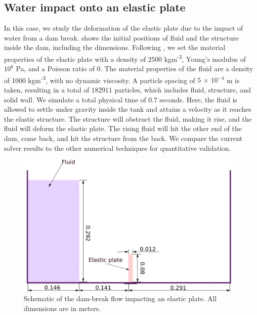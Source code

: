 \subsection{Water impact onto an elastic plate}
\label{sec:water-impact-forefront}
In this case, we study the deformation of the elastic
plate due to the impact of water from a dam break.
 shows the initial positions
of fluid and the structure inside the dam, including the dimensions. Following
\cite{sun2019fully}, we set the material properties of the elastic plate with a
density of $2500$ kgm\textsuperscript{-3}, Young's modulus of $10^6$ Pa, and a
Poisson ratio of $0$. The material properties of the fluid are a density of 1000
kgm\textsuperscript{-3}, with no dynamic viscosity. A particle spacing of $5$
$\times$ $10^{-4}$ m is taken, resulting in a total of $182911$ particles, which
includes fluid, structure, and solid wall. We simulate a total physical time of
$0.7$ seconds. Here, the fluid is allowed to settle under gravity inside the
tank and attains a velocity as it reaches the elastic structure. The structure
will obstruct the fluid, making it rise, and the fluid will deform the elastic
plate. The rising fluid will hit the other end of the dam, come back, and hit
the structure from the back. We compare the current solver results to the other
numerical techniques for quantitative validation.
\begin{figure}
  \centering
  \includegraphics[scale=0.4]{images/fsi/images/sun_2019_dam_breaking_flow_impacting_an_elastic_plate/schematic}
  \caption{Schematic of the dam-break flow impacting an elastic plate. All dimensions are in meters.}
\label{fig:dam-break-flow-impact-plate-initial-setup}
\end{figure}

